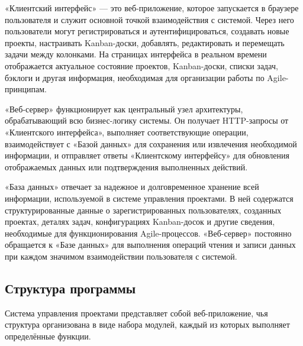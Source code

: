  «Клиентский интерфейс» — это веб-приложение, которое запускается в браузере пользователя и служит основной точкой взаимодействия с системой. Через него пользователи могут регистрироваться и аутентифицироваться, создавать новые проекты, настраивать Kanban-доски, добавлять, редактировать и перемещать задачи между колонками. На страницах интерфейса в реальном времени отображается актуальное состояние проектов, Kanban-доски, списки задач, бэклоги и другая информация, необходимая для организации работы по Agile-принципам.
 
 «Веб-сервер» функционирует как центральный узел архитектуры, обрабатывающий всю бизнес-логику системы. Он получает HTTP-запросы от «Клиентского интерфейса», выполняет соответствующие операции, взаимодействует с «Базой данных» для сохранения или извлечения необходимой информации, и отправляет ответы «Клиентскому интерфейсу» для обновления отображаемых данных или подтверждения выполненных действий.
 
 «База данных» отвечает за надежное и долговременное хранение всей информации, используемой в системе управления проектами. В ней содержатся структурированные данные о зарегистрированных пользователях, созданных проектах, деталях задач, конфигурациях Kanban-досок и другие сведения, необходимые для функционирования Agile-процессов. «Веб-сервер» постоянно обращается к «Базе данных» для выполнения операций чтения и записи данных при каждом значимом взаимодействии пользователя с системой.
 
\subsection{Структура программы}
Система управления проектами представляет собой веб-приложение, чья структура организована в виде набора модулей, каждый из которых выполняет определённые функции.
